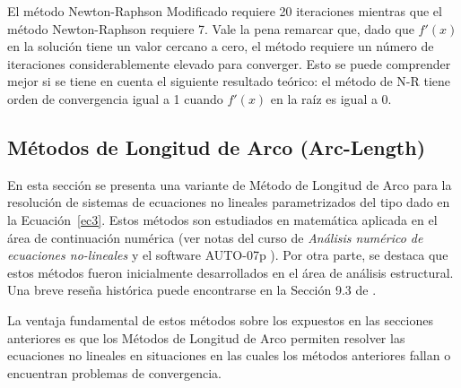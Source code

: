 El método Newton-Raphson Modificado requiere 20 iteraciones mientras que el método Newton-Raphson requiere 7. %
%
Vale la pena remarcar que, dado que $f'(x)$ en la solución tiene un valor cercano a cero, el método requiere un número de iteraciones considerablemente elevado para converger. %
%
Esto se puede comprender mejor si se tiene en cuenta el siguiente resultado teórico: el método de N-R tiene orden de convergencia igual a 1 cuando $f'(x)$ en la raíz es igual a 0.





\subsection{Métodos de Longitud de Arco (Arc-Length)}\label{ArcLength}

En esta sección se presenta una variante de Método de Longitud de Arco para la resolución de sistemas de ecuaciones no lineales parametrizados del tipo dado en la Ecuación~\eqref{ec3}. %
%
Estos métodos son estudiados en matemática aplicada en el área de continuación numérica (ver notas del curso de \textit{Análisis numérico de ecuaciones no-lineales} \citep{Doedl2014Slides} y el software AUTO-07p \citep{AUTO-07p}). %
%
Por otra parte, se destaca que estos métodos fueron inicialmente desarrollados en el área de análisis estructural. %
%
Una breve reseña histórica puede encontrarse en la Sección 9.3 de \citep{crisfield1996non}. 

La ventaja fundamental de estos métodos sobre los expuestos en las secciones anteriores es que los Métodos de Longitud de Arco permiten resolver las ecuaciones no lineales en situaciones en las cuales los métodos anteriores fallan o encuentran problemas de convergencia.

